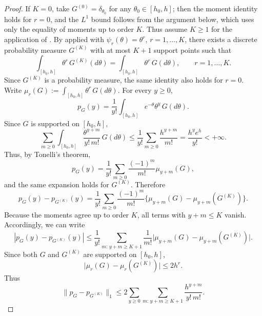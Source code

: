 \documentclass[twoside,12pt]{article}
\begin{document}
\begin{proof}
If $K=0$, take $G^{(0)}=\delta_{\theta_0}$ for any $\theta_0\in[h_{0},h]$; then the moment identity holds for $r=0$, and the $L^1$ bound follows from the argument below, which
uses only the equality of moments up to order $K$. Thus assume $K\ge 1$ for the application of \citet[Lemma A.1]{Gho(01)}. By \citet[Lemma A.1]{Gho(01)} applied with $\psi_r(\theta)=\theta^r$, $r=1,\dots,K$, there exists a discrete probability measure $G^{(K)}$ with at most $K+1$ support points such that
\begin{displaymath}
\int_{[h_{0},h]} \theta^r\,G^{(K)}(d\theta)=\int_{[h_{0},h]} \theta^r\,G(d\theta),\qquad r=1,\dots,K.
\end{displaymath}
Since $G^{(K)}$ is a probability measure, the same identity also holds for $r=0$. Write $\mu_r(G):=\int_{[h_{0},h]} \theta^r\,G(d\theta)$. For every $y\ge 0$,
\begin{displaymath}
p_G(y)=\frac{1}{y!}\int_{[h_{0},h]} e^{-\theta}\theta^y\,G(d\theta).
\end{displaymath}
Since $G$ is supported on $[h_{0},h]$,
\begin{displaymath}
\sum_{m\ge 0}\int_{[h_{0},h]} \frac{\theta^{y+m}}{y!\,m!}\,G(d\theta)\le\frac{1}{y!}\sum_{m\ge 0}\frac{h^{y+m}}{m!}=\frac{h^y e^h}{y!}<+\infty.
\end{displaymath}
Thus, by Tonelli's theorem,
\begin{displaymath}
p_G(y)=\frac{1}{y!}\sum_{m\ge 0}\frac{(-1)^m}{m!}\mu_{y+m}(G),
\end{displaymath}
and the same expansion holds for $G^{(K)}$. Therefore
\begin{displaymath}
p_G(y)-p_{G^{(K)}}(y)=\frac{1}{y!}\sum_{m\ge 0}\frac{(-1)^m}{m!}\bigl\{\mu_{y+m}(G)-\mu_{y+m}(G^{(K)})\bigr\}.
\end{displaymath}
Because the moments agree up to order $K$, all terms with $y+m\le K$ vanish. Accordingly, we can write
\begin{displaymath}
|p_G(y)-p_{G^{(K)}}(y)|\le\frac{1}{y!}\sum_{m:\,y+m\ge K+1}\frac{1}{m!}\bigl|\mu_{y+m}(G)-\mu_{y+m}(G^{(K)})\bigr|.
\end{displaymath}
Since both $G$ and $G^{(K)}$ are supported on $[h_{0},h]$,
\begin{displaymath}
\bigl|\mu_r(G)-\mu_r(G^{(K)})\bigr|\le2h^r.
\end{displaymath}
Thus
\begin{displaymath}
\|p_G-p_{G^{(K)}}\|_1\le2\sum_{y\ge 0}\sum_{m:\,y+m\ge K+1}\frac{h^{y+m}}{y!\,m!}.

\end{displaymath}
\end{proof}
\end{document}
